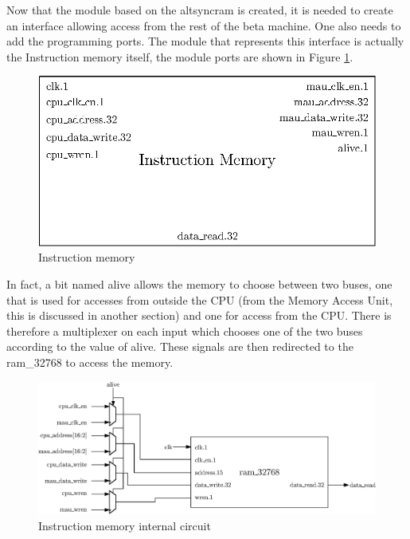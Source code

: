 Now that the module based on the altsyncram is created, it is needed to create an interface allowing 
access from the rest of the beta machine. One also needs to add the programming ports. The
module that represents this interface is actually the Instruction memory itself, the module ports
are shown in Figure \ref{fig:components/im}.

\begin{figure}[H]
    \centering
    \includegraphics[scale=0.8]{Chapter3-CPU/res/instruction_memory}
    \caption{Instruction memory}
    \label{fig:components/im}
\end{figure}

In fact, a bit named alive allows the memory to choose between two buses, one that is used for 
accesses from outside the CPU (from the Memory Access Unit, this is discussed in another 
section) and one for access from the CPU. There is therefore a multiplexer on each input which
chooses one of the two buses according to the value of alive. These signals are then redirected to 
the ram\_32768 to access the memory.

\begin{figure}[H]
    \centering
    \includegraphics[width=\linewidth]{Chapter3-CPU/res/instruction_memory_in}
    \caption{Instruction memory internal circuit}
    \label{fig:components/im_in}
\end{figure}

